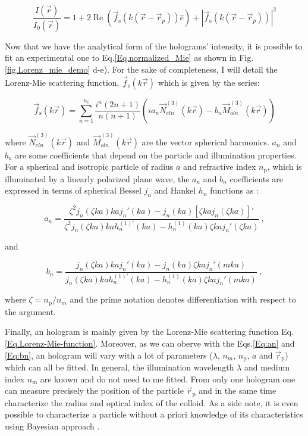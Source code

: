 \begin{equation}
	\frac{I(\vec{r})}{I_0(\vec{r})} = 1 + 2 \operatorname{Re} 
	\left(  
		\vec{f}_\mathrm{s}(k(\vec{r}- \vec{r}_p)) \hat{e}
	\right)
	+
	|
		\vec{f}_\mathrm{s}(k(\vec{r}- \vec{r}_p))
	|^2
	\label{Eq.normalized_Mie}	
\end{equation}


Now that we have the analytical form of the holograms' intensity, it is possible to fit an experimental one to Eq.\ref{Eq.normalized_Mie} as shown in Fig.\ref{fig.Lorenz_mie_demo} d-e). For the sake of completeness, I will detail the Lorenz-Mie scattering function, $\vec{f}_\mathrm{s}(k\vec{r})$ which is given by the series:

\begin{equation}
	\vec{f}_\mathrm{s}(k \vec{r}) = \sum _{n=1} ^{n_c} 
	\frac
	{
		i^n (2n +1)
	}
	{
		n(n+1)
	}
	\left(
		i a_n \vec{N}^{(3)}_{eln}(k\vec{r})
		-
		b_n \vec{M}^{(3)}_{oln}(k\vec{r})
	\right)
	\label{Eq.Lorenz-Mie-function}
\end{equation} 


where $\vec{N}^{(3)}_{eln}(k\vec{r})$ and $\vec{M}^{(3)}_{oln}(k\vec{r})$ are the vector spherical harmonics. $a_n$ and $b_n$ are some coefficients that depend on the particle and illumination properties. For a spherical and isotropic particle of radius $a$ and refractive index $n_\mathrm{p}$, which is illuminated by a linearly polarized plane wave, the $a_n$ and $b_n$ coefficients are expressed in terms of spherical Bessel $j_n$ and Hankel $h_n$ functions as \cite{f_bohren_absorption_1998}:

\begin{equation}
	a_n = 
	\frac
	{
		\zeta^2 j_n (\zeta k a)k a j_n' (k a) - j_n(ka)[\zeta kaj_n(\zeta ka)]'
	}
	{
		\zeta^2 j_n (\zeta k a)k a h_n^{(1)'} (k a) - h_n^{(1)}(ka)\zeta kaj_n'(\zeta ka)
	} ~,
	\label{Eq:an}
\end{equation}

and

\begin{equation}
	b_n =
	\frac
	{
		j_n(\zeta k a) kaj_n'(ka) - j_n (ka) \zeta kaj_n'(mka)
	}
	{
		j_n(\zeta k a) kah_n^{(1)'}(ka) - h_n^{(1)} (ka) \zeta kaj_n '(mka)
	} ~,
	\label{Eq:bn}
\end{equation}


where $\zeta = n_\mathrm{p} / n_m $ and the prime notation denotes differentiation with respect to the argument. 
	
Finally, an hologram is mainly given by the Lorenz-Mie scattering function Eq.\ref{Eq.Lorenz-Mie-function}. Moreover, as we can oberve with the Eqs.\ref{Eq:an} and \ref{Eq:bn}, an hologram will vary with a lot of parameters ($\lambda$, $n_m$, $n_\mathrm{p}$, $a$ and $\vec{r}_\mathrm{p}$) which can all be fitted. In general, the illumination wavelength $\lambda$ and medium index $n_\mathrm{m}$ are known and do not need to me fitted. From only one hologram one can measure precisely the position of the particle $\vec{r}_\mathrm{p}$ and in the same time characterize the radius and optical index of the colloid. As a side note, it is even possible to characterize a particle without a priori knowledge of its characteristics using Bayesian approach \cite{gregory_bayesian_2005, dimiduk_bayesian_2016}.

